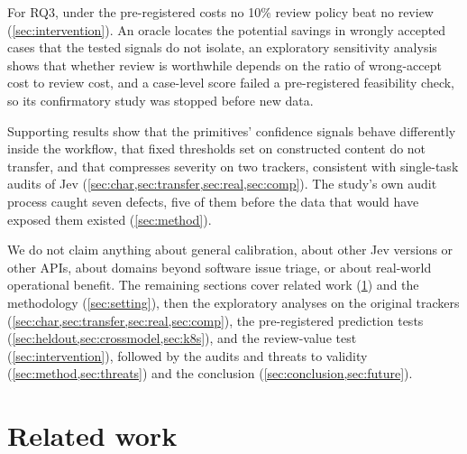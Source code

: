 For RQ3, under the pre-registered costs no 10\%
review policy beat no review (\cref{sec:intervention}). An oracle locates
the potential savings in wrongly accepted cases that the tested signals
do not isolate, an exploratory sensitivity analysis shows that whether
review is worthwhile depends on the ratio of wrong-accept cost to review
cost, and a case-level score failed a pre-registered feasibility check,
so its confirmatory study was stopped before new data.

Supporting results show
that the primitives' confidence signals behave differently inside the
workflow, that fixed thresholds set on constructed content do not
transfer, and that \score{} compresses severity on two trackers,
consistent with single-task audits of Jev
\citep{deusser2026jev,meng2026jevaudit}
(\cref{sec:char,sec:transfer,sec:real,sec:comp}). The study's own audit
process caught seven defects, five of them before the data that would
have exposed them existed (\cref{sec:method}).

We do not claim anything about general calibration, about other Jev
versions or other APIs, about domains beyond software issue triage, or
about real-world operational benefit. The remaining sections cover
related work (\cref{sec:related}) and the methodology (\cref{sec:setting}),
then the exploratory analyses on the original trackers
(\cref{sec:char,sec:transfer,sec:real,sec:comp}), the pre-registered
prediction tests (\cref{sec:heldout,sec:crossmodel,sec:k8s}), and the
review-value test (\cref{sec:intervention}), followed by the audits and
threats to validity (\cref{sec:method,sec:threats}) and the conclusion
(\cref{sec:conclusion,sec:future}).

\section{Related work}
\label{sec:related}

